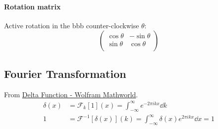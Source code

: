 \paragraph{Rotation matrix}
Active rotation in the bbb counter-clockwise $\theta$:
\begin{equation}
    \left(
    \begin{array}{cc}
        \cos{\theta} & -\sin{\theta} \\
        \sin{\theta} & \cos{\theta} \\
    \end{array}
    \right)
\end{equation}

\subsection{Fourier Transformation}
\label{sec:Fourier-Transformation}
From
\href{http://mathworld.wolfram.com/DeltaFunction.html}{Delta Function
- Wolfram Mathworld}.
\begin{align}
    \delta(x) &= \mathcal{F}_k[1](x) = \int_{-\infty}^{\infty}
        e^{-2\pi i kx} \dd k \\
    1 &= \mathcal{F}^{-1}[\delta(x)](k) = \int_{-\infty}^{\infty}
        \delta(x) e^{2\pi ikx}\dd x= 1
\end{align}

